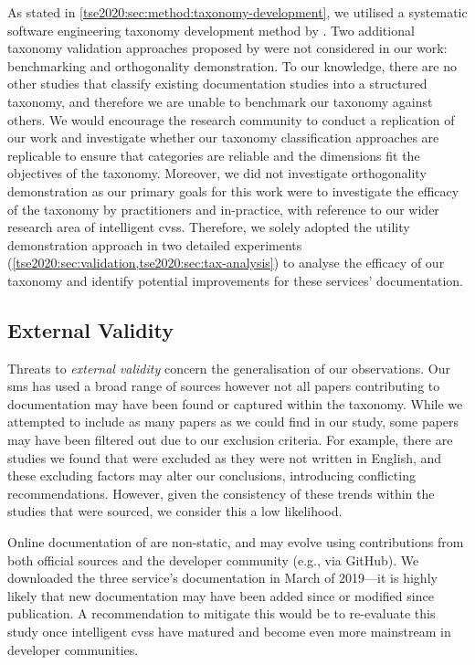 As stated in \cref{tse2020:sec:method:taxonomy-development}, we utilised a systematic software engineering taxonomy development method by \citet{Usman:2017hn}. Two additional taxonomy validation approaches proposed by \citeauthor{Usman:2017hn} were not considered in our work: benchmarking and orthogonality demonstration. To our knowledge, there are no other studies that classify existing  documentation studies into a structured taxonomy, and therefore we are unable to benchmark our taxonomy against others. We would encourage the research community to conduct a replication of our work and investigate whether our taxonomy classification approaches are replicable to ensure that categories are reliable and the dimensions fit the objectives of the taxonomy. Moreover, we did not investigate orthogonality demonstration as our primary goals for this work were to investigate the efficacy of the taxonomy by practitioners and in-practice, with reference to our wider research area of intelligent \glspl{cvs}. Therefore, we solely adopted the utility demonstration approach in two detailed experiments (\cref{tse2020:sec:validation,tse2020:sec:tax-analysis}) to analyse the efficacy of our taxonomy and identify potential improvements for these services'  documentation.

\subsection{External Validity}\label{tse2020:sec:limitations:internal}

Threats to \textit{external validity} concern the generalisation of our observations. Our \gls{sms} has used a broad range of sources however not all papers contributing to  documentation may have been found or captured within the taxonomy. While we attempted to include as many papers as we could find in our study, some papers may have been filtered out due to our exclusion criteria. For example, there are studies we found that were excluded as they were not written in English, and these excluding factors may alter our conclusions, introducing conflicting recommendations. However, given the consistency of these trends within the studies that were sourced, we consider this a low likelihood.

Online documentation of  are non-static, and may evolve using contributions from both official sources and the developer community (e.g., via GitHub). We downloaded the three service's  documentation in March of 2019---it is highly likely that new documentation may have been added since or modified since publication. A recommendation to mitigate this would be to re-evaluate this study once intelligent \glspl{cvs} have matured and become even more mainstream in developer communities.

